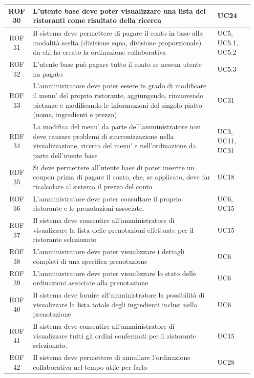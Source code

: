 \documentclass[12pt, oneside]{article}
\begin{document}
\begin{longtable}{|c|p{14cm}|p{2cm}|}
    \hline
    ROF 30 & L'utente base deve poter visualizzare una lista dei ristoranti come risultato della ricerca & UC24 \\
    \hline
    ROF 31 & Il sistema deve permettere di pagare il conto in base alla modalità scelta (divisione equa, divisione proporzionale) da chi ha creato la ordinazione collaborativa & UC5, UC5.1, UC5.2 \\
    \hline
    ROF 32 & L'utente base può pagare tutto il conto se nessun utente ha pagato & UC5.3 \\
    \hline
    ROF 33 & L'amministratore deve poter essere in grado di modificare il menu' del proprio ristorante, aggiungendo, rimuovendo pietanze e modificando le informazioni del singolo piatto (nome, ingredienti e prezzo) & UC31 \\
    \hline
    RDF 34 & La modifica del menu' da parte dell'amministratore non deve causare problemi di sincronizzazione nella visualizzazione, ricerca del menu' e nell'ordinazione da parte dell'utente base &  UC3, UC11, UC31 \\
    \hline
    RDF 35 & Si deve permettere all'utente base di poter inserire un coupon prima di pagare il conto, che, se applicato, deve far ricalcolare al sistema il prezzo del conto & UC18 \\
    \hline
    ROF 36 & L'amministratore deve poter consultare il proprio ristorante e le prenotazioni associate. & UC6, UC15 \\
    \hline
    ROF 37 & Il sistema deve consentire all'amministratore di visualizzare la lista delle prenotazioni effettuate per il ristorante selezionato & UC15 \\
    \hline
    ROF 38 & L'amministratore deve poter visualizzare i dettagli completi di una specifica prenotazione & UC6 \\
    \hline
    ROF 39 & L'amministratore deve poter visualizzare lo stato delle ordinazioni associate alla prenotazione & UC6 \\
    \hline
    ROF 40 & Il sistema deve fornire all'amministratore la possibilità di visualizzare la lista totale degli ingredienti inclusi nella prenotazione & UC6 \\
    \hline
    ROF 41 & Il sistema deve consentire all'amministratore di visualizzare tutti gli ordini confermati per il ristorante selezionato. & UC15 \\
    \hline
    ROF 42 & Il sistema deve permettere di annullare l'ordinazione collaborativa nel tempo utile per farlo & UC28 \\

\end{longtable}
\end{document}
